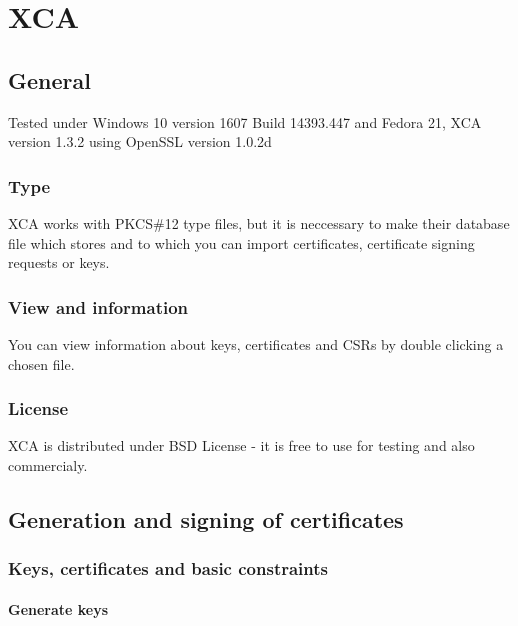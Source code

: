 \documentclass[10pt, a4paper]{report}
\begin{document}
{\chapter{XCA}

\section{General}

Tested under Windows 10 version 1607 Build 14393.447 and Fedora 21, XCA version 1.3.2 using OpenSSL version 1.0.2d

  \subsection{Type}
XCA works with PKCS\#12 type files, but it is neccessary to make their database file which stores and to which you can import certificates, certificate signing requests or keys.
  \subsection{View and information}
You can view information about keys, certificates and CSRs by double clicking a chosen file.
  \subsection{License}
XCA is distributed under BSD License - it is free to use for testing and also commercialy.
  
\section{Generation and signing of certificates}

  \subsection{Keys, certificates and basic constraints}
  
    \subsubsection{Generate keys}
    
}
\end{document}
